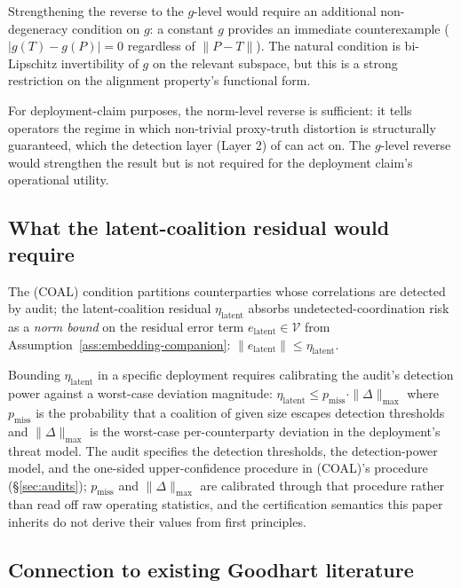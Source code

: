 Strengthening the reverse to the $g$-level would require an
additional non-degeneracy condition on $g$: a constant $g$
provides an immediate counterexample
($|g(T) - g(P)| = 0$ regardless of $\|P - T\|$). The natural
condition is bi-Lipschitz invertibility of $g$ on the relevant
subspace, but this is a strong restriction on the alignment
property's functional form.

For deployment-claim purposes, the norm-level reverse is
sufficient: it tells operators the regime in which non-trivial
proxy-truth distortion is structurally guaranteed, which the
detection layer (Layer 2) of \citep[Deployment Safety]{lasser2026paper10} can act
on. The $g$-level reverse would strengthen the result but is not
required for the deployment claim's operational utility.

\subsection{What the latent-coalition residual would require}

The (COAL) condition partitions counterparties whose correlations
are detected by audit; the latent-coalition residual
$\eta_\mathrm{latent}$ absorbs undetected-coordination risk as a
\emph{norm bound} on the residual error term $e_\mathrm{latent}
\in \mathcal{V}$ from
Assumption~\ref{ass:embedding-companion}: $\|e_\mathrm{latent}\|
\leq \eta_\mathrm{latent}$.

Bounding $\eta_\mathrm{latent}$ in a specific deployment requires
calibrating the audit's detection power against a worst-case
deviation magnitude: $\eta_\mathrm{latent} \leq p_\mathrm{miss}
\cdot \|\Delta\|_{\max}$ where $p_\mathrm{miss}$ is the probability
that a coalition of given size escapes detection thresholds and
$\|\Delta\|_{\max}$ is the worst-case per-counterparty deviation
in the deployment's threat model. The audit specifies the
detection thresholds, the detection-power model, and the
one-sided upper-confidence procedure in (COAL)'s procedure
(\S\ref{sec:audits}); $p_\mathrm{miss}$ and $\|\Delta\|_{\max}$
are calibrated through that procedure rather than read off raw
operating statistics, and the certification semantics this paper
inherits do not derive their values from first principles.

\subsection{Connection to existing Goodhart literature}

